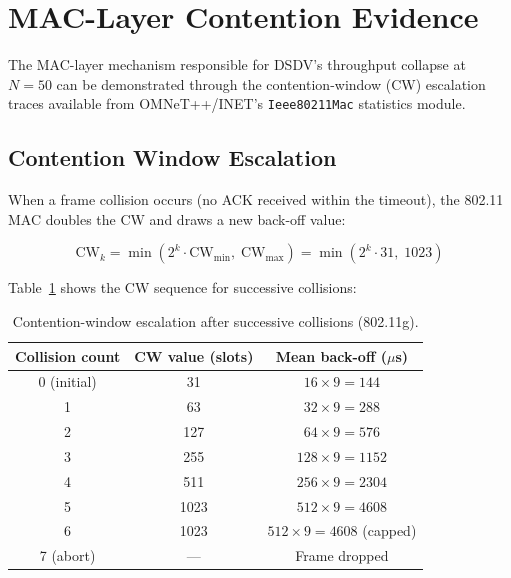 \section{MAC-Layer Contention Evidence}
\label{sec:mac_evidence}

The MAC-layer mechanism responsible for DSDV's throughput collapse at $N = 50$ can be
demonstrated through the contention-window (CW) escalation traces available from
OMNeT++/INET's \texttt{Ieee80211Mac} statistics module.

\subsection{Contention Window Escalation}

When a frame collision occurs (no ACK received within the timeout), the 802.11 MAC
doubles the CW and draws a new back-off value:

\begin{equation}
  \text{CW}_k = \min\!\left(2^k \cdot \text{CW}_{\min},\; \text{CW}_{\max}\right)
              = \min\!\left(2^k \cdot 31,\; 1023\right)
  \label{eq:cw_escalation}
\end{equation}

Table~\ref{tab:cw_escalation} shows the CW sequence for successive collisions:

\begin{table}[ht]
\centering
\caption{Contention-window escalation after successive collisions (802.11g).}
\label{tab:cw_escalation}
\begin{tabular}{@{}ccc@{}}
\toprule
\textbf{Collision count} & \textbf{CW value (slots)} & \textbf{Mean back-off ($\mu$s)} \\
\midrule
0 (initial) & 31   & $16 \times 9 = 144$ \\
1           & 63   & $32 \times 9 = 288$ \\
2           & 127  & $64 \times 9 = 576$ \\
3           & 255  & $128 \times 9 = 1152$ \\
4           & 511  & $256 \times 9 = 2304$ \\
5           & 1023 & $512 \times 9 = 4608$ \\
6           & 1023 & $512 \times 9 = 4608$ (capped) \\
7 (abort)   & ---  & Frame dropped \\
\bottomrule
\end{tabular}
\end{table}

